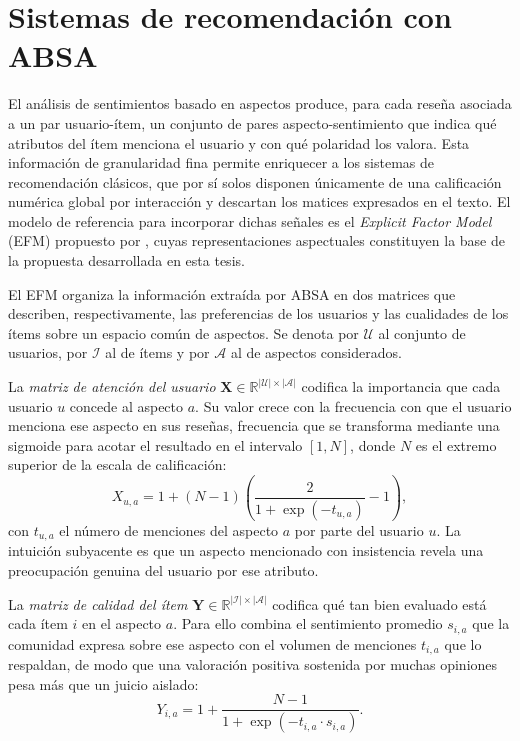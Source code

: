 \section{Sistemas de recomendación con ABSA} \label{sec:absa_rs}

El análisis de sentimientos basado en aspectos produce, para cada reseña asociada a un par usuario-ítem, un conjunto de pares aspecto-sentimiento que indica qué atributos del ítem menciona el usuario y con qué polaridad los valora. Esta información de granularidad fina permite enriquecer a los sistemas de recomendación clásicos, que por sí solos disponen únicamente de una calificación numérica global por interacción y descartan los matices expresados en el texto. El modelo de referencia para incorporar dichas señales es el \textit{Explicit Factor Model} (EFM) propuesto por \citet{zhang_explicit_2014}, cuyas representaciones aspectuales constituyen la base de la propuesta desarrollada en esta tesis.

El EFM organiza la información extraída por ABSA en dos matrices que describen, respectivamente, las preferencias de los usuarios y las cualidades de los ítems sobre un espacio común de aspectos. Se denota por $\mathcal{U}$ al conjunto de usuarios, por $\mathcal{I}$ al de ítems y por $\mathcal{A}$ al de aspectos considerados.

La \textit{matriz de atención del usuario} $\mathbf{X} \in \mathbb{R}^{|\mathcal{U}| \times |\mathcal{A}|}$ codifica la importancia que cada usuario $u$ concede al aspecto $a$. Su valor crece con la frecuencia con que el usuario menciona ese aspecto en sus reseñas, frecuencia que se transforma mediante una sigmoide para acotar el resultado en el intervalo $[1, N]$, donde $N$ es el extremo superior de la escala de calificación:
\begin{equation} \label{eq:efm_X}
	X_{u,a} = 1 + (N - 1) \left(\frac{2}{1 + \exp(-t_{u,a})} - 1\right),
\end{equation}
con $t_{u,a}$ el número de menciones del aspecto $a$ por parte del usuario $u$. La intuición subyacente es que un aspecto mencionado con insistencia revela una preocupación genuina del usuario por ese atributo.

La \textit{matriz de calidad del ítem} $\mathbf{Y} \in \mathbb{R}^{|\mathcal{I}| \times |\mathcal{A}|}$ codifica qué tan bien evaluado está cada ítem $i$ en el aspecto $a$. Para ello combina el sentimiento promedio $s_{i,a}$ que la comunidad expresa sobre ese aspecto con el volumen de menciones $t_{i,a}$ que lo respaldan, de modo que una valoración positiva sostenida por muchas opiniones pesa más que un juicio aislado:
\begin{equation} \label{eq:efm_Y}
	Y_{i,a} = 1 + \frac{N - 1}{1 + \exp(-t_{i,a} \cdot s_{i,a})}.
\end{equation}

